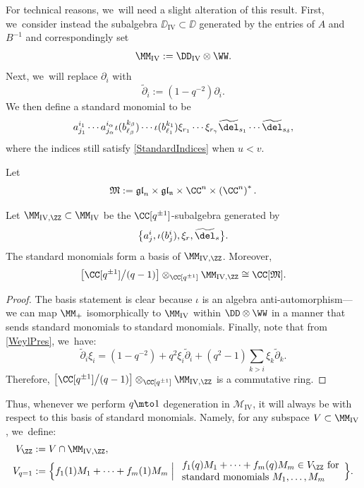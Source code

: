 For technical reasons, we~will need a slight alteration of this result.
First, we~consider instead the subalgebra $\DD_{\mathrm{IV}}\subset\DD$ generated by the entries of $A$ and $B^{-1}$ and correspondingly set
\[
\MM_{\mathrm{IV}}:=\DD_{\mathrm{IV}}\otimes\WW.
\]
Next, we~will replace $\partial_i$ with
\[
\widetilde{\partial}_i:=(1-q^{-2})\partial_i.
\]
We then define a standard monomial to be
\[
a^{i_1}_{j_1}\cdots a^{i_{\alpha}}_{j_{\alpha}}
\iota(b^{k_{\beta}}_{\ell_{\beta}})\cdots \iota(b^{k_1}_{\ell_1})
\xi_{r_1}\cdots \xi_{r_\gamma}
\widetilde{\del}_{s_1}\cdots\widetilde{\del}_{s_\delta},
\]
where the indices still satisfy \eqref{StandardIndices} when $u<v$.

Let
\[
\mathfrak{M}:=\mathfrak{gl}_n\times\mathfrak{gl_n}\times\CC^n\times\left(\CC^n\right)^*.
\]

\begin{cor}\label{StandardCor}
Let $\MM_{\mathrm{IV},\ZZ}\subset\MM_{\mathrm{IV}}$ be the $\CC[q^{\pm 1}]$-subalgebra generated by
\[
\bigl\{a^i_j, \iota(b^i_j), \xi_r, \widetilde{\del}_s \bigr\}.
\]
The standard monomials form a basis of $\MM_{\mathrm{IV,\ZZ}}$.
Moreover,
\[
\bigl[ \CC[q^{\pm 1}]\big/ (q-1) \bigr]\otimes_{\CC[q^{\pm 1}]}\MM_{\mathrm{IV},\ZZ}\cong \CC[\mathfrak{M}].
\]
\end{cor}

\begin{proof}
The basis statement is clear because $\iota$ is an algebra anti-automorphism---we can map $\MM_+$ isomorphically to $\MM_{\mathrm{IV}}$ within $\DD\otimes\WW$ in a manner that sends standard monomials to standard monomials.
Finally, note that from \eqref{WeylPres}, we~have:
\[
\widetilde{\partial}_i\xi_i= (1-q^{-2})+q^2\xi_i\widetilde{\partial}_i+(q^2-1)\sum_{k>i}\xi_k\widetilde{\partial}_k.
\]
Therefore, $\left[ \CC[q^{\pm 1}]\big/(q-1) \right]\otimes_{\CC[q^{\pm 1}]}\MM_{\mathrm{IV},\ZZ}$ is a commutative ring.
\end{proof}

Thus, whenever we perform $q\mto 1$ degeneration in $\mathcal{M}_{\mathrm{IV}}$, it will always be with respect to this basis of standard monomials.
Namely, for any subspace $V\subset\MM_{\mathrm{IV}}$, we~define:
\begin{align}
V_\ZZ&:= V\cap \MM_{\mathrm{IV},\ZZ},\\
V_{q=1}&:=\Bigl\{f_1(1)M_1+\cdots +f_m(1)M_m\Bigm|
\begin{array}{l}
f_1(q)M_1+\cdots+f_m(q)M_m\in V_\ZZ\hbox{ for}\\
\hbox{standard monomials }M_1,\ldots ,M_m
\end{array}
\Bigr\}.
\label{DegenDef}
\end{align}

